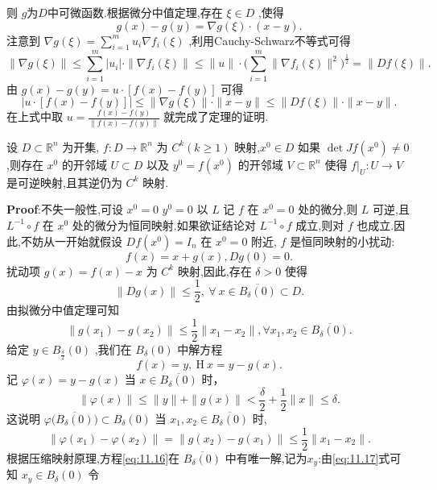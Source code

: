 则 $g$为$D$中可微函数.根据微分中值定理,存在 $\xi\in D$ ,使得  
$$
g(x)-g(y)=\nabla g(\xi)\cdot(x-y).
$$
注意到 $\nabla g(\xi)=\sum_{i=1}^{m}u_{i}\nabla f_{i}(\xi)$ ,利用Cauchy-Schwarz不等式可得  
$$
\|\nabla g(\xi)\|\leqslant\sum_{i=1}^{m}|u_{i}|\cdot\|\nabla f_{i}(\xi)\|\leqslant\|u\|\cdot\Big(\sum_{i=1}^{m}\|\nabla f_{i}(\xi)\|^{2}\Big)^{\frac{1}{2}}=\|Df(\xi)\|.
$$
由 $g(x)-g(y)=u\cdot\left[f(x)-f(y)\right]$ 可得 
$$
\left|u\cdot[f(x)-f(y)]\right|\leqslant\|\nabla g(\xi)\|\cdot\|x-y\|\leqslant\|Df(\xi)\|\cdot\|x-y\|.
$$
在上式中取 $u={\frac{f(x)-f(y)}{\|f(x)-f(y)\|}}$ 就完成了定理的证明.
\begin{tcolorbox}[colback=KuangNei,colframe=BianKuang,title=\textbf{逆映射定理},sharpish corners]
    设 $D\subset\mathbb{R}^{n}$ 为开集, $f:D\to\mathbb{R}^{n}$ 为 $C^{k}(k\geqslant1)$ 映射,$x^{0}\in D$ 如果 $\operatorname*{det}J f(x^{0})\neq0$ ,则存在 $x^{0}$ 的开邻域 $U\subset D$ 
    以及 $y^{0}=f(x^{0})$ 的开邻域 $V\subset\mathbb{R}^{n}$ 使得 $f|_{U}:U\to V$ 是可逆映射,且其逆仍为 $C^{k}$ 映射.
\end{tcolorbox}
\textbf{Proof}:不失一般性,可设 $x^{0}=0$ $y^{0}=0$ 以 $L$ 记 $f$ 在 $x^{0}=0$ 处的微分,则 $L$ 可逆,且 $L^{-1}\circ f$ 在 $x^{0}$ 处的微分为恒同映射.如果欲证结论对 $L^{-1}\circ f$ 成立,则对 $f$ 也成立.因此,不妨从一开始就假设 $D f(x^{0})=I_{n}$  
在 $x^{0}=0$ 附近, $f$ 是恒同映射的小扰动:  
$$
f(x)=x+g(x),D g(0)=0.
$$
扰动项 $g(x)=f(x)-x$ 为 $C^{k}$ 映射,因此,存在 $\delta>0$ 使得  
$$
\|D g(x)\|\leqslant\frac{1}{2},~\forall~x\in\overline{{B_{\delta}(0)}}\subset D.
$$
由拟微分中值定理可知  
$$
\|g(x_{1})-g(x_{2})\|\leqslant\frac{1}{2}\|x_{1}-x_{2}\|,\forall x_{1},x_{2}\in\overline{{B_{\delta}(0)}}.
$$
给定 $y\in B_{\frac{\delta}{2}}(0)$ ,我们在 $B_{\delta}(0)$ 中解方程  
\begin{equation}
    f(x)=y,\mathrm{\mathrm{~}}\mathrm{\mathrm{H~}}x=y-g(x).
    \label{eq:11.16}
\end{equation}
记 $\varphi(x)=y-g(x)$ 当 $x\in\overline{{B_{\delta}(0)}}$ 时，  
\begin{equation}
    \|\varphi(x)\|\leqslant\|y\|+\|g(x)\|<\frac{\delta}{2}+\frac{1}{2}\|x\|\leqslant\delta.
    \label{eq:11.17}
\end{equation}
这说明 $\varphi\big(\overline{{B_{\delta}(0)}}\big)\subset B_{\delta}(0)$ 当 $x_{1},x_{2}\in\overline{{B_{\delta}(0)}}$ 时,  
$$
\|\varphi(x_{1})-\varphi(x_{2})\|=\|g(x_{2})-g(x_{1})\|\leqslant{\frac{1}{2}}\|x_{1}-x_{2}\|.
$$
根据压缩映射原理,方程\eqref{eq:11.16}在 $\overline{{B_{\delta}(0)}}$ 中有唯一解,记为$x_{y}$:由\eqref{eq:11.17}式可知 $x_{y}\in B_{\delta}(0)$ 令  
